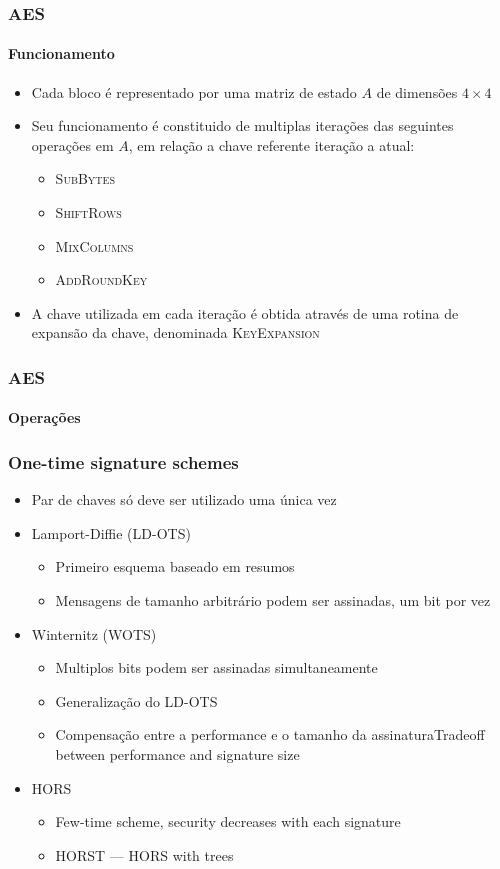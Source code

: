 \documentclass[12pt]{beamer}
\begin{document}
\begin{frame}
    \frametitle{AES}
    \framesubtitle{Funcionamento}
    \begin{itemize}
        \item Cada bloco é representado por uma matriz de estado $A$ de dimensões $4 \times 4$
        \item Seu funcionamento é constituido de multiplas iterações das seguintes operações em $A$, em relação a chave referente iteração a atual:
        \begin{itemize}
            \item\textsc{SubBytes}
            \item\textsc{ShiftRows}
            \item\textsc{MixColumns}
            \item\textsc{AddRoundKey}
        \end{itemize}
        \item A chave utilizada em cada iteração é obtida através de uma rotina de expansão da chave, denominada \textsc{KeyExpansion}
    \end{itemize}
\end{frame}

\begin{frame}
    \frametitle{AES}
    \framesubtitle{Operações}
    
\end{frame}

\begin{frame}
  \frametitle{One-time signature schemes}
  \begin{itemize}
    \item Par de chaves só deve ser utilizado uma única vez
    \item Lamport-Diffie (LD-OTS)
    \begin{itemize}
      \item Primeiro esquema baseado em resumos
      \item Mensagens de tamanho arbitrário podem ser assinadas, um bit por vez
    \end{itemize}
    \item Winternitz (WOTS)
    \begin{itemize}
      \item Multiplos bits podem ser assinadas simultaneamente
      \item Generalização do LD-OTS
      \item Compensação entre a performance e o tamanho da assinaturaTradeoff between performance and signature size
    \end{itemize}
    \item HORS
    \begin{itemize}
      \item Few-time scheme, security decreases with each signature
      \item HORST --- HORS with trees
    \end{itemize}
  \end{itemize}
\end{frame}
\end{document}
